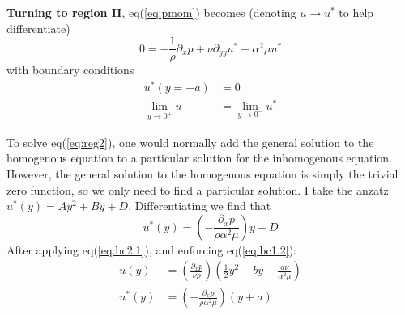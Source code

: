 \documentclass[11pt]{article}
\begin{document}
\textbf{Turning to region II}, eq(\ref{eq:pmom}) becomes (denoting $u\to u^*$ to help differentiate)
\begin{equation}
  0 = -\frac{1}{\rho}\partial_xp + \nu \partial_{yy}u^* + \alpha^2\mu u^* \label{eq:reg2}
\end{equation}
with boundary conditions
\begin{align}
  u^*(y=-a) &= 0 \label{eq:bc2.1}\\
  \lim_{y\to 0^+}u &= \lim_{y\to 0^-}u^* \label{eq:bc2.2}
\end{align}

To solve eq(\ref{eq:reg2}), one would normally add the general solution to the homogenous equation to a particular solution for the inhomogenous equation. However, the general solution to the homogenous equation is simply the trivial zero function, so we only need to find a particular solution. I take the anzatz $u^*(y) = Ay^2+By+D$. Differentiating we find that
\begin{equation}
  u^*(y) = \left( -\frac{\partial_xp}{\rho \alpha^2 \mu} \right)y + D
\end{equation}
After applying eq(\ref{eq:bc2.1}), and enforcing eq(\ref{eq:bc1.2}):
\begin{equation}
  \boxed{
    \begin{aligned}
      u(y) &= \left( \frac{\partial_xp}{\nu \rho} \right) \left(\frac{1}{2}y^2 -by - \frac{a\nu}{\alpha^2\mu}\right)\\
      u^*(y) &= \left(-\frac{\partial_xp}{\rho \alpha^2 \mu}\right)(y+a)
    \end{aligned}
  }
\end{equation}
\end{document}
